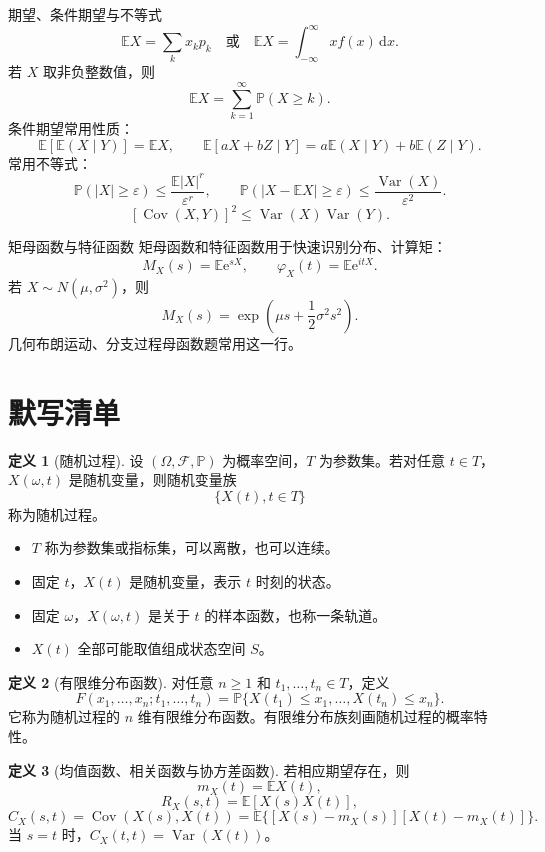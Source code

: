 \documentclass[12pt,a4paper,openany]{ctexrep}
\theoremstyle{definition}
\newtheorem{definition}{定义}[section]
\newcommand{\E}{\mathbb{E}}
\newcommand{\Var}{\operatorname{Var}}
\newcommand{\Cov}{\operatorname{Cov}}
\newcommand{\Pp}{\mathbb{P}}
\newcommand{\dd}{\,\mathrm{d}}
\newcommand{\e}{\mathrm{e}}
\begin{document}
\begin{reviewbox}{期望、条件期望与不等式}
\[
\E X=\sum_k x_kp_k\quad\text{或}\quad \E X=\int_{-\infty}^{\infty}xf(x)\dd x.
\]
若 $X$ 取非负整数值，则
\[
\E X=\sum_{k=1}^{\infty}\Pp(X\ge k).
\]
条件期望常用性质：
\[
\E[\E(X\mid Y)]=\E X,\qquad
\E[aX+bZ\mid Y]=a\E(X\mid Y)+b\E(Z\mid Y).
\]
常用不等式：
\[
\Pp(|X|\ge \varepsilon)\le \frac{\E |X|^r}{\varepsilon^r},\qquad
\Pp(|X-\E X|\ge \varepsilon)\le \frac{\Var(X)}{\varepsilon^2}.
\]
\[
[\Cov(X,Y)]^2\le \Var(X)\Var(Y).
\]
\end{reviewbox}

\begin{reviewbox}{矩母函数与特征函数}
矩母函数和特征函数用于快速识别分布、计算矩：
\[
M_X(s)=\E\e^{sX},\qquad \varphi_X(t)=\E\e^{itX}.
\]
若 $X\sim N(\mu,\sigma^2)$，则
\[
M_X(s)=\exp\left(\mu s+\frac12\sigma^2s^2\right).
\]
几何布朗运动、分支过程母函数题常用这一行。
\end{reviewbox}

\section{默写清单}

\begin{definition}[随机过程]
设 $(\Omega,\mathcal F,\Pp)$ 为概率空间，$T$ 为参数集。若对任意 $t\in T$，
$X(\omega,t)$ 是随机变量，则随机变量族
\[
\{X(t),t\in T\}
\]
称为随机过程。
\end{definition}

\begin{itemize}
	\item $T$ 称为参数集或指标集，可以离散，也可以连续。
	\item 固定 $t$，$X(t)$ 是随机变量，表示 $t$ 时刻的状态。
	\item 固定 $\omega$，$X(\omega,t)$ 是关于 $t$ 的样本函数，也称一条轨道。
	\item $X(t)$ 全部可能取值组成状态空间 $S$。
\end{itemize}

\begin{definition}[有限维分布函数]
对任意 $n\ge1$ 和 $t_1,\dots,t_n\in T$，定义
\[
F(x_1,\dots,x_n;t_1,\dots,t_n)
=
\Pp\{X(t_1)\le x_1,\dots,X(t_n)\le x_n\}.
\]
它称为随机过程的 $n$ 维有限维分布函数。有限维分布族刻画随机过程的概率特性。
\end{definition}

\begin{definition}[均值函数、相关函数与协方差函数]
若相应期望存在，则
\[
m_X(t)=\E X(t),
\]
\[
R_X(s,t)=\E[X(s)X(t)],
\]
\[
C_X(s,t)=\Cov(X(s),X(t))
=\E\{[X(s)-m_X(s)][X(t)-m_X(t)]\}.
\]
当 $s=t$ 时，$C_X(t,t)=\Var(X(t))$。
\end{definition}
\end{document}
